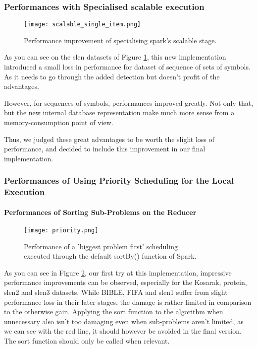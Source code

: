 \documentclass{eplmastersthesis}
\begin{document}
\subsubsection{Performances with Specialised scalable execution}

\begin{figure}[h]
  \centering
  \texttt{[image: scalable\_single\_item.png]}
  \caption{Performance improvement of specialising spark's scalable stage.}
  \label{fig:scalable_single_item}
\end{figure}

As you can see on the slen datasets of Figure \ref{fig:scalable_single_item}, this new implementation introduced a small loss in performance for dataset of sequence of sets of symbols. As it needs to go through the added detection but doesn't profit of the advantages. \newline

However, for sequences of symbols, performances improved greatly. Not only that, but the new internal database representation make much more sense from a memory-consumption point of view. \newline

Thus, we judged these great advantages to be worth the slight loss of performance, and decided to include this improvement in our final implementation.

\subsubsection{Performances of Using Priority Scheduling for the Local Execution}

\paragraph{Performances of Sorting Sub-Problems on the Reducer}

\begin{figure}[h]
  \centering
  \texttt{[image: priority.png]}
  \caption[Naive priority scheduling]{
  		Performance of a 'biggest problem first' scheduling \\
  		executed through the default sortBy() function of Spark.
  	\endtabular
  }
  \label{fig:priority_scheduling_performance_comparison}
\end{figure}

As you can see in Figure \ref{fig:priority_scheduling_performance_comparison}, our first try at this implementation, impressive performance improvements can be observed, especially for the Kosarak, protein, slen2 and slen3 datasets. While BIBLE, FIFA and slen1 suffer from slight performance loss in their later stages, the damage is rather limited in comparison to the otherwise gain. Applying the sort function to the algorithm when unnecessary also isn't too damaging even when sub-problems aren't limited, as we can see with the red line, it should however be avoided in the final version. The sort function should only be called when relevant.\newline
\end{document}
